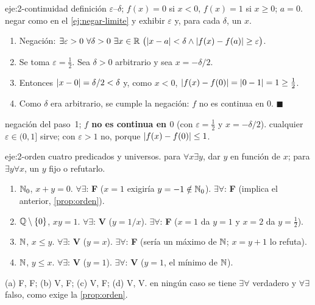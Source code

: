 \begin{solucion}{eje:2-continuidad}
\datos definición $\varepsilon$–$\delta$; $f(x)=0$ si $x<0$, $f(x)=1$ si $x\ge 0$; $a=0$.
\planteamiento negar como en el \cref{ej:negar-limite} y exhibir $\varepsilon$ y, para cada $\delta$, un $x$.
\pasos
\begin{enumerate}[label=\arabic*.]
  \item Negación: $\exists\varepsilon>0\ \forall\delta>0\ \exists x\in\R\ \bigl(\abs{x-a}<\delta\wedge\abs{f(x)-f(a)}\ge\varepsilon\bigr)$.
  \item Se toma $\varepsilon=\tfrac12$. Sea $\delta>0$ arbitrario y sea $x=-\delta/2$.
  \item Entonces $\lvert x-0\rvert=\delta/2<\delta$ y, como $x<0$, $\lvert f(x)-f(0)\rvert=\lvert0-1\rvert=1\ge\tfrac12$.
  \item Como $\delta$ era arbitrario, se cumple la negación: $f$ no es continua en $0$. $\blacksquare$
\end{enumerate}
\resultado negación del paso~1; \textbf{$f$ no es continua en $0$} (con $\varepsilon=\tfrac12$ y $x=-\delta/2$).
\comprobacion cualquier $\varepsilon\in(0,1]$ sirve; con $\varepsilon>1$ no, porque $\lvert f(x)-f(0)\rvert\le 1$.
\end{solucion}

\begin{solucion}{eje:2-orden}
\datos cuatro predicados y universos.
\planteamiento para $\forall x\exists y$, dar $y$ en función de $x$; para $\exists y\forall x$, un $y$ fijo o refutarlo.
\pasos
\begin{enumerate}[label=(\alph*)]
  \item $\mathbb{N}_0$, $x+y=0$. $\forall\exists$: \textbf{F} ($x=1$ exigiría $y=-1\notin\mathbb{N}_0$). $\exists\forall$: \textbf{F} (implica el anterior, \cref{prop:orden}).
  \item $\mathbb{Q}\setminus\{0\}$, $xy=1$. $\forall\exists$: \textbf{V} ($y=1/x$). $\exists\forall$: \textbf{F} ($x=1$ da $y=1$ y $x=2$ da $y=\tfrac12$).
  \item $\mathbb{N}$, $x\le y$. $\forall\exists$: \textbf{V} ($y=x$). $\exists\forall$: \textbf{F} (sería un máximo de $\mathbb{N}$; $x=y+1$ lo refuta).
  \item $\mathbb{N}$, $y\le x$. $\forall\exists$: \textbf{V} ($y=1$). $\exists\forall$: \textbf{V} ($y=1$, el mínimo de $\mathbb{N}$).
\end{enumerate}
\resultado (a) F, F; (b) V, F; (c) V, F; (d) V, V.
\comprobacion en ningún caso se tiene $\exists\forall$ verdadero y $\forall\exists$ falso, como exige la \cref{prop:orden}.
\end{solucion}

